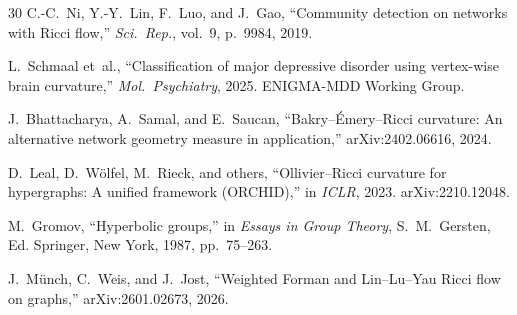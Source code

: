 \documentclass[11pt,a4paper]{article}
\begin{document}
\begin{thebibliography}{30}
C.-C.~Ni, Y.-Y.~Lin, F.~Luo, and J.~Gao,
``Community detection on networks with Ricci flow,''
\emph{Sci.~Rep.}, vol.~9, p.~9984, 2019.

L.~Schmaal et~al.,
``Classification of major depressive disorder using vertex-wise brain curvature,''
\emph{Mol.~Psychiatry}, 2025. ENIGMA-MDD Working Group.

J.~Bhattacharya, A.~Samal, and E.~Saucan,
``Bakry--\'Emery--Ricci curvature: An alternative network geometry measure in application,''
arXiv:2402.06616, 2024.

D.~Leal, D.~W\"olfel, M.~Rieck, and others,
``Ollivier--Ricci curvature for hypergraphs: A unified framework (ORCHID),''
in \emph{ICLR}, 2023. arXiv:2210.12048.

M.~Gromov,
``Hyperbolic groups,''
in \emph{Essays in Group Theory}, S.~M.~Gersten, Ed. Springer, New York, 1987, pp.~75--263.

J.~M\"unch, C.~Weis, and J.~Jost,
``Weighted Forman and Lin--Lu--Yau Ricci flow on graphs,''
arXiv:2601.02673, 2026.

\end{thebibliography}
\end{document}
